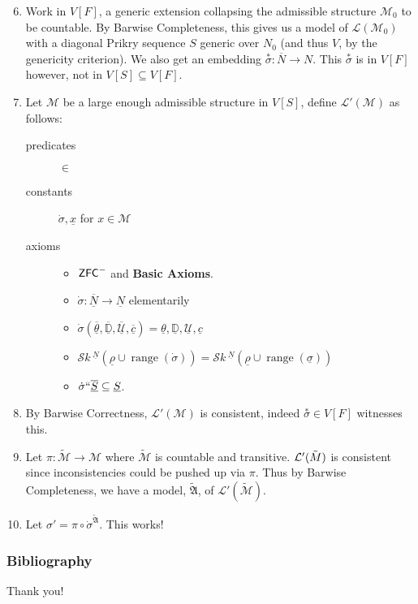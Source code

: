 \documentclass[utf8x,xcolor=svgnames,8pt]{beamer}
\newcommand{\M}{\mathcal{M}}
\newcommand{\D}{\mathbb{D}}
\newcommand{\N}{{\overline{N}}}
\renewcommand{\U}{\mathcal{U}}
\newcommand{\ZFC}{\textup{\ensuremath{\textsf{ZFC}}}}
\DeclareMathOperator{\ran}{range}
\newcommand{\To}{\longrightarrow}
\newcommand{\SH}{\mathcal{S}\textit{k} \,}
\newcommand{\sk}[3]{\SH^{#1}( {#2} \cup {\ran(#3)} ) }
\begin{document}
\begin{frame}
\begin{enumerate}\setcounter{enumi}{5}
	\item Work in $V[F]$, a generic extension collapsing the admissible structure $\mathcal M_0$ to be countable. By Barwise Completeness, this gives us a model of $\mathcal L(\M_0)$ with a diagonal Prikry sequence $S$ generic over $N_0$ (and thus $V$, by the genericity criterion). We also get an embedding $\overset{*}\sigma: \N \To N$. This $\overset{*}\sigma$ is in $V[F]$ however, not in $V[S]\subseteq V[F]$.
	\item Let $\mathcal M$ be a large enough admissible structure in $V[S]$, define $\mathcal L'(\mathcal M)$ as follows: 
\begin{description}
	\item[predicates] $\in$ 
	\item[constants] $\dot{\sigma}, \underline x$ for $x \in \mathcal M$
	\item[axioms] \begin{itemize} \item $\ZFC^-$ and \textbf{Basic Axioms}.
		\item $\dot \sigma : \overline{\underline N} \To \underline N$ elementarily
		\item $\dot{\sigma}(\overline{\underline{\theta}}, \overline{\underline{\D}}, \overline{\underline{\U}}, \overline{\underline c})=\underline{\theta}, \underline{\D}, \underline{\U}, \underline{c}$
		\item $\sk{\underline N}{\underline \rho}{\dot{\sigma}} = \sk{\underline N}{\underline \rho}{\underline \sigma}$
		\item $\dot \sigma ``\overline{\underline S} \subseteq \underline S$.
	\end{itemize}
\end{description}
	\item By Barwise Correctness, $\mathcal L'(\mathcal M)$ is consistent, indeed $\overset{*}\sigma \in V[F]$ witnesses this. 
	\item Let $\pi: \tilde{\mathcal M} \To \mathcal M$ where $\tilde{\mathcal M}$ is countable and transitive. $\mathcal L'(\tilde{\mathcal \M})$ is consistent since inconsistencies could be pushed up via $\pi$. Thus by Barwise Completeness, we have a model, $\tilde{\mathfrak A}$, of $\mathcal L'(\tilde{\mathcal M})$.
	\item Let $\sigma' =\pi \circ \dot{\sigma}^{\tilde{\mathfrak A}}$. This works! \qedhere
\end{enumerate}
\end{frame}




\begin{frame}
\frametitle{Bibliography}


\end{frame}

\begin{frame}
\center Thank you!
\end{frame}
\end{document}
